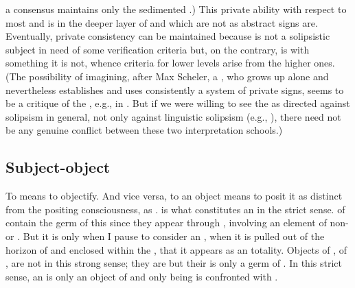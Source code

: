 {  a consensus maintains only the sedimented .) This private ability
  with respect to most   and  is
   in the deeper layer of  and  which are
  not  as abstract signs are.  Eventually, private consistency
  can be maintained because  is not a solipsistic subject in need
  of some  verification criteria but, on the contrary, is
   with something it is not, whence criteria for lower levels
  arise from the higher ones. (The possibility of imagining, after Max Scheler,
  a , who grows up alone and nevertheless establishes and
  uses consistently a system of private signs, seems to be a critique of the
  , e.g., in \citeauthor*{LanguageRules}. But if we were willing
  to see the  as directed against solipsism in general, not only
  against linguistic solipsism (e.g., \citeauthor*{LanguageRulesMalcolm}), there
  need not be any genuine conflict between these two interpretation schools.)}



\subsection{Subject-object}\label{sub:subobj}
\pa
To  means to objectify. And vice versa, to  an object 
means to posit it as distinct from the positing consciousness, as . 
 is what constitutes an  in the strict sense. 
 of  contain the germ of this 
 since they appear through , involving an element 
of non- or . But it is only when I pause to
consider an , when it is pulled out of the horizon of
 and enclosed within the \hoa,
that it appears as an 
totality. Objects of , of , are not 
 in this strong sense; they are  but 
their  is only a germ of .
In this strict sense, an  is only an object of  
and only  being is confronted with .

